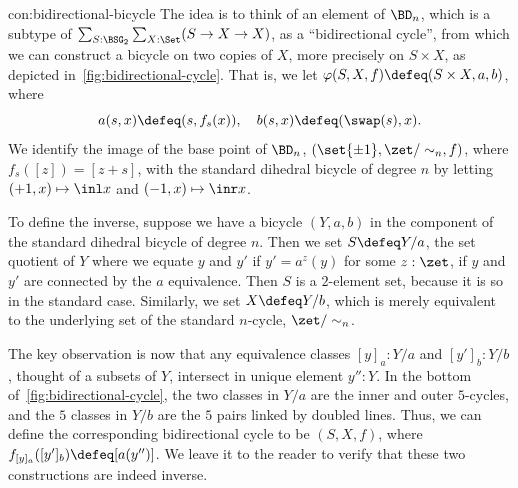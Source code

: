 \begin{marginfigure}
  \noindent{}
  \caption{How a bidirectional $5$-cycle corresponds to a
    dihedral bicycle of degree $5$. The doubled \casbluename
    lines indicate that $b$ swaps the two endpoints.}
  \label{fig:bidirectional-cycle}
\end{marginfigure}
\begin{implementation}{con:bidirectional-bicycle}
  The idea is to think of an element of $\BD_n$,
  which is a subtype of $\sum_{S:\BSG_2}\sum_{X:\Set}(S \to X \to X)$,
  as a ``bidirectional cycle'', from which we can construct
  a bicycle on two copies of $X$, more precisely on $S\times X$,
  as depicted in~\cref{fig:bidirectional-cycle}.
  That is, we let $\varphi(S,X,f) \defeq (S\times X,a,b)$,
  where
  \[
    a(s,x) \defeq (s,f_s(x)), \quad b(s,x) \defeq (\swap(s), x).
  \]
  We identify the image of the base point of $\BD_n$, $(\set{\pm1}, \zet/\sim_n, f)$,
  where $f_s([z]) = [z + s]$,
  with the standard dihedral bicycle of degree $n$ by letting
  $(+1,x) \mapsto \inl x$ and $(-1,x)\mapsto \inr x$.

  To define the inverse, suppose we have a bicycle $(Y,a,b)$
  in the component of the standard dihedral bicycle of degree $n$.
  Then we set $S\defeq Y/a$, the set quotient of $Y$ where we equate
  $y$ and $y'$ if $y'=a^z(y)$ for some $z:\zet$,
  \ie if $y$ and $y'$ are connected by the $a$ equivalence.
  Then $S$ is a $2$-element set, because it is so in the standard case.
  Similarly, we set $X\defeq Y/b$, which is merely equivalent to
  the underlying set of the standard $n$-cycle, $\zet/\sim_n$.

  The key observation is now that any equivalence classes $[y]_a:Y/a$
  and $[y']_b:Y/b$, thought of a subsets of $Y$,
  intersect in unique element $y'':Y$. In the bottom of~\cref{fig:bidirectional-cycle},
  the two classes in $Y/a$ are the inner and outer $5$-cycles, and
  the $5$ classes in $Y/b$ are the $5$ pairs linked by doubled \casbluename
  lines.
  Thus, we can define the corresponding bidirectional cycle to be
  $(S,X,f)$, where $f_{[y]_a}([y']_b) \defeq [a(y'')]$.
  We leave it to the reader to verify that these two constructions are
  indeed inverse.
\end{implementation}
